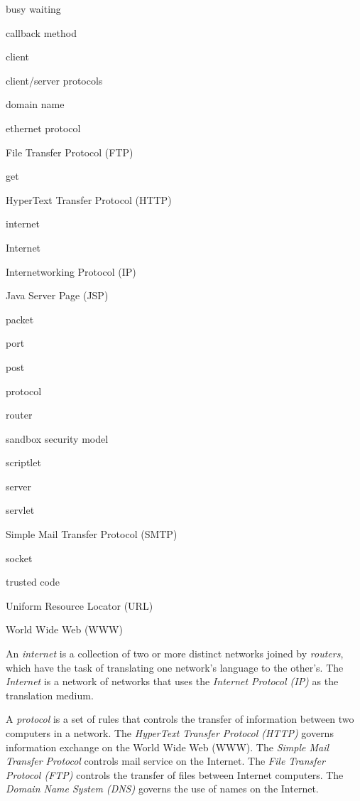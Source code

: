 {{{{
\label{chapter-summary}

\label{technical-terms}
\begin{KT}
busy waiting

callback method

client

client/server protocols

domain name

ethernet protocol

File Transfer Protocol (FTP)

get

HyperText Transfer Protocol (HTTP)

internet

Internet

Internetworking Protocol (IP)

Java Server Page (JSP)

packet

port

post

protocol

router

sandbox security model

scriptlet

server

servlet

Simple Mail Transfer Protocol (SMTP)

socket

trusted code

Uniform Resource Locator (URL)

World Wide Web (WWW)

\end{KT}


\label{summaryof-important-points}
\begin{SMBL}
\item  An {\it internet} is a collection of two or more distinct networks
joined by {\it routers}, which have the task of translating one
network's language to the other's.  The {\it Internet} is a network of networks
that uses the {\it Internet Protocol (IP)} as the translation medium.

\item  A {\it protocol} is a set of rules that controls the transfer
of information between two computers in a network.  The {\it HyperText
Transfer Protocol (HTTP)} governs information exchange on the World
Wide Web (WWW). The {\it Simple Mail Transfer Protocol} controls mail
service on the Internet.  The {\it File Transfer Protocol (FTP)}
controls the transfer of files between Internet computers.  The {\it
Domain Name System (DNS)} governs the use of names on the Internet.


\end{SMBL}}}}}
